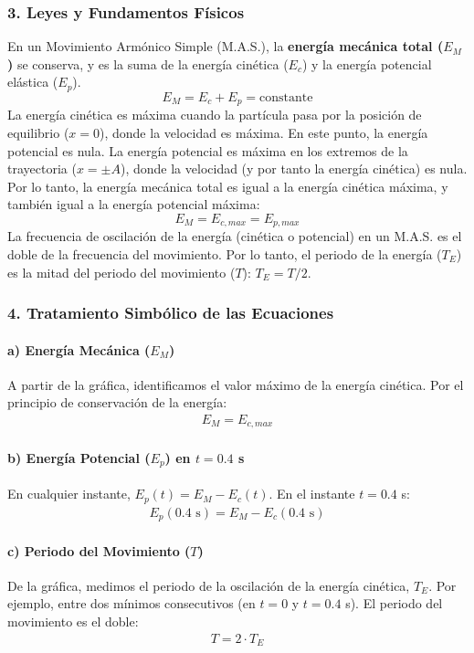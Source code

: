 \subsubsection*{3. Leyes y Fundamentos Físicos}
En un Movimiento Armónico Simple (M.A.S.), la \textbf{energía mecánica total ($E_M$)} se conserva, y es la suma de la energía cinética ($E_c$) y la energía potencial elástica ($E_p$).
$$ E_M = E_c + E_p = \text{constante} $$
La energía cinética es máxima cuando la partícula pasa por la posición de equilibrio ($x=0$), donde la velocidad es máxima. En este punto, la energía potencial es nula.
La energía potencial es máxima en los extremos de la trayectoria ($x=\pm A$), donde la velocidad (y por tanto la energía cinética) es nula.
Por lo tanto, la energía mecánica total es igual a la energía cinética máxima, y también igual a la energía potencial máxima:
$$ E_M = E_{c,max} = E_{p,max} $$
La frecuencia de oscilación de la energía (cinética o potencial) en un M.A.S. es el doble de la frecuencia del movimiento. Por lo tanto, el periodo de la energía ($T_E$) es la mitad del periodo del movimiento ($T$): $T_E = T/2$.

\subsubsection*{4. Tratamiento Simbólico de las Ecuaciones}
\paragraph*{a) Energía Mecánica ($E_M$)}
A partir de la gráfica, identificamos el valor máximo de la energía cinética. Por el principio de conservación de la energía:
\begin{gather}
    E_M = E_{c,max}
\end{gather}

\paragraph*{b) Energía Potencial ($E_p$) en $t=0.4$ s}
En cualquier instante, $E_p(t) = E_M - E_c(t)$. En el instante $t=0.4$ s:
\begin{gather}
    E_p(0.4\text{ s}) = E_M - E_c(0.4\text{ s})
\end{gather}

\paragraph*{c) Periodo del Movimiento ($T$)}
De la gráfica, medimos el periodo de la oscilación de la energía cinética, $T_E$. Por ejemplo, entre dos mínimos consecutivos (en $t=0$ y $t=0.4$ s). El periodo del movimiento es el doble:
\begin{gather}
    T = 2 \cdot T_E
\end{gather}

